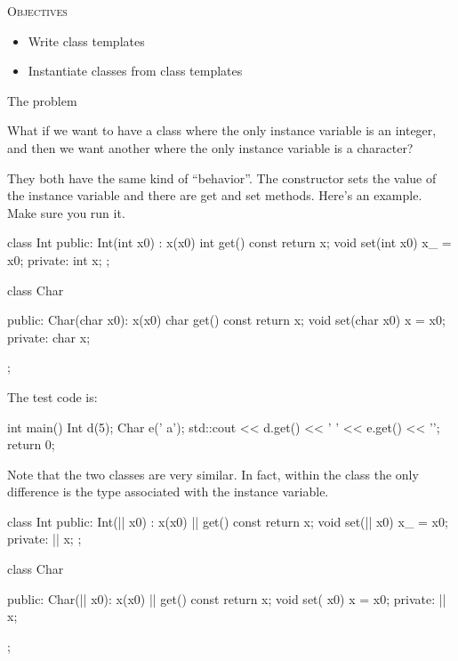 
\textsc{Objectives}

\begin{itemize}
\item
  Write class templates
\item
  Instantiate classes from class templates
\end{itemize}

The problem

What if we want to have a class where the only instance variable is an integer, and then we want another where the only instance variable is a character?

They both have the same kind of ``behavior''. The constructor sets the
value of the instance variable and there are get and set methods. Here's
an example. Make sure you run it.

\begin{console}
class Int
{
public:
     Int(int x0)
         : x(x0)
     {}
     int get() const { return x; }
     void set(int x0) { x_ = x0; }
private:
     int x;
};

class Char
{
public:
     Char(char x0): x(x0) {}
     char get() const { return x; }
     void set(char x0) { x = x0; }
private:
     char x;

}; 
\end{console}

The test code is:

\begin{console}
int main()
{   
    Int d(5);
    Char e(' a');
    std::cout << d.get() << ' '
              << e.get() << '\n';
    return 0;
} 
\end{console}

Note that the two classes are very similar. In fact, within the class
the only difference is the type associated with the instance variable.

\begin{consolethree}[escapeinside=||]
class Int
{
public:
     Int(|| x0)
           : x(x0)
     {}
     || get() const { return x; }
     void set(|| x0) { x_ = x0; }
private:
     || x;
};

class Char
{
public:
     Char(|| x0): x(x0) {}
     || get() const { return x; }
     void set( x0) { x = x0; }
private:
     || x;

}; 
\end{consolethree}

